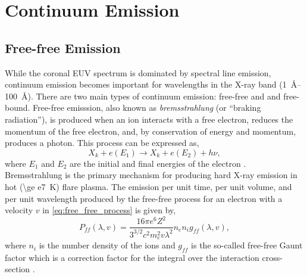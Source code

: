 \section{Continuum Emission}\label{sec:continuum}

\subsection{Free-free Emission}

While the coronal EUV spectrum is dominated by spectral line emission, continuum emission becomes important for wavelengths in the X-ray band (\SIrange{1}{100}{\angstrom}). There are two main types of continuum emission: free-free and and free-bound. Free-free emisssion, also known as \textit{bremsstrahlung} (or ``braking radiation''), is produced when an ion interacts with a free electron, reduces the momentum of the free electron, and, by conservation of energy and momentum, produces a photon. This process can be expressed as,
\begin{equation}\label{eq:free_free_process}
    X_k + e(E_1) \to X_k + e(E_2) + h\nu,
\end{equation}
where $E_1$ and $E_2$ are the initial and final energies of the electron \citep{del_zanna_solar_2018}. Bremsstrahlung is the primary mechanism for producing hard X-ray emission in hot (\SI{\ge e7}{\kelvin}) flare plasma. The emission per unit time, per unit volume, and per unit wavelength produced by the free-free process for an electron with a velocity $v$ in \autoref{eq:free_free_process} is given by,
\begin{equation}\label{eq:bremsstrahlung_single}
    P_{ff}(\lambda,v) = \frac{16\pi e^6Z^2}{3^{3/2}c^2m_e^2v\lambda^2}n_en_ig_{ff}(\lambda,v),
\end{equation}
where $n_i$ is the number density of the ions and $g_{ff}$ is the so-called free-free Gaunt factor which is a correction factor for the integral over the interaction cross-section \citep{rybicki_radiative_1979}.

